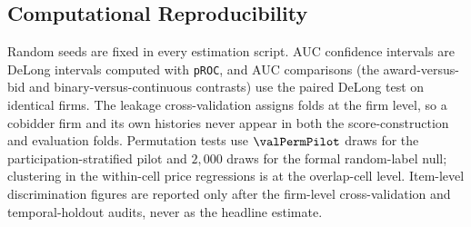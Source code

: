 \subsection{Computational Reproducibility}
\label{app:reproducibility_submission}

Random seeds are fixed in every estimation script. AUC confidence
intervals are DeLong intervals computed with \texttt{pROC}, and
AUC comparisons (the award-versus-bid and binary-versus-continuous
contrasts) use the paired DeLong test on identical firms. The
leakage cross-validation assigns folds at the firm level, so a
cobidder firm and its own histories never appear in both the
score-construction and evaluation folds. Permutation tests use
$\valPermPilot$ draws for the participation-stratified pilot and
$2{,}000$ draws for the formal random-label null; clustering in
the within-cell price regressions is at the overlap-cell level.
Item-level discrimination figures are reported only after the
firm-level cross-validation and temporal-holdout audits, never as
the headline estimate.
